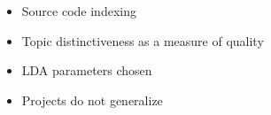
\begin{itemize}

\item Source code indexing
\item Topic distinctiveness as a measure of quality
\item LDA parameters chosen
\item Projects do not generalize

\end{itemize}
